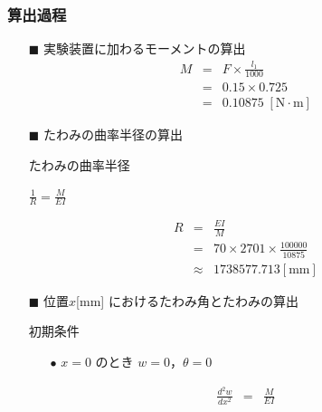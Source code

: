 \documentclass[twocolumn,a4j]{jsarticle}
\begin{document}
\subsubsection{算出過程}
\begin{itemize}
    \item [$\blacksquare$] 実験装置に加わるモーメントの算出
          \begin{eqnarray*}
              M &=& F × \frac{l_1}{1000}\\
              &=& 0.15 × 0.725\\
              &=& 0.10875 \;\left[\mathrm{N \cdot m}\right]
          \end{eqnarray*}
    \item [$\blacksquare$] たわみの曲率半径の算出
          \begin{itembox}[l]{たわみの曲率半径}
              \begin{center}
                  $\displaystyle \frac{1}{R} = \frac{M}{EI}$
              \end{center}
          \end{itembox}
          \begin{eqnarray*}
              R &=& \frac{EI}{M}\\
              &=& 70 × 2701 × \frac{100000}{10875}\\
              &\approx& 1738577.713 \left[\mathrm{mm}\right]
          \end{eqnarray*}
    \item [$\blacksquare$] 位置$x$[mm] におけるたわみ角とたわみの算出
          \begin{itembox}[l]{初期条件}
              \begin{itemize}
                  \item [$\bullet$] $x=0$ のとき $w=0$，$\theta =0$
              \end{itemize}
          \end{itembox}
          \begin{eqnarray*}
              \frac{d^2w}{dx^2}&=&\frac{M}{EI}\\

\end{eqnarray*}
\end{itemize}
\end{document}
